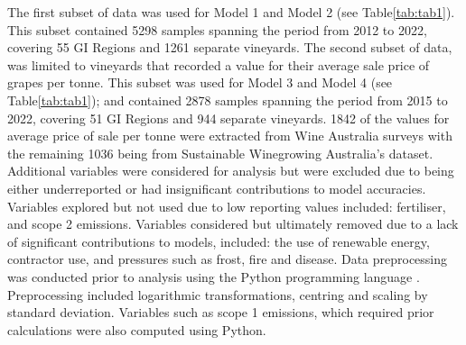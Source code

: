 \documentclass[review,12pt,authoryear]{elsarticle}
\begin{document}
\begin{linenumbers}
\newline
The first subset of data was used for Model 1 and Model 2 (see Table\ref{tab:tab1}). This subset contained 5298 samples spanning the period from 2012 to 2022, covering 55 GI Regions and 1261 separate vineyards.
\newline
The second subset of data, was limited to vineyards that recorded a value for their average sale price of grapes per tonne. This subset was used for Model 3 and Model 4 (see Table\ref{tab:tab1}); and contained 2878 samples spanning the period from 2015 to 2022, covering 51 GI Regions and 944 separate vineyards. 1842 of the values for average price of sale per tonne were extracted from Wine Australia surveys with the remaining 1036 being from Sustainable Winegrowing Australia's dataset.
\newline
Additional variables were considered for analysis but were excluded due to being either underreported or had insignificant contributions to model accuracies. Variables explored but not used due to low reporting values included: fertiliser, and scope 2 emissions. Variables considered but ultimately removed due to a lack of significant contributions to models, included: the use of renewable energy, contractor use, and pressures such as frost, fire and disease.
\newline
Data preprocessing was conducted prior to analysis using the Python programming language \citep{g.vanrossumPythonTutorialTechnical1995}. Preprocessing included logarithmic transformations, centring and scaling by standard deviation. Variables such as scope 1 emissions, which required prior calculations were also computed using Python.

\end{linenumbers}
\end{document}
